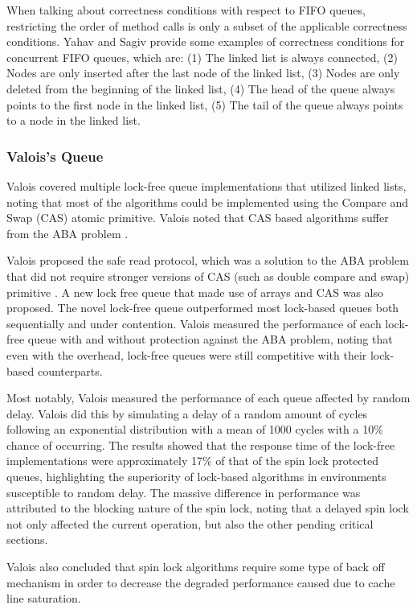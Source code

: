 \documentclass[a4paper, 12pt, titlepage]{article}
\begin{document}
\begin{singlespace}
When talking about correctness conditions with respect to FIFO queues, restricting the order of method calls is only a subset of the applicable correctness conditions. Yahav and Sagiv\cite{yahav2003automatically} provide some examples of correctness conditions for concurrent FIFO queues, which are: (1) The linked list is always connected, (2) Nodes are only inserted after the last node of the linked list, (3) Nodes are only deleted from the beginning of the linked list, (4) The head of the queue always points to the first node in the linked list, (5) The tail of the queue always points to a node in the linked list.

\subsubsection{Valois's Queue}
Valois covered multiple lock-free queue implementations that utilized linked lists, noting that most of the algorithms could be implemented using the Compare and Swap (CAS) atomic primitive. Valois noted that CAS based algorithms suffer from the ABA problem \cite{valois1994implementing}. 

Valois proposed the safe read protocol, which was a solution to the ABA problem that did not require stronger versions of CAS (such as double compare and swap) primitive \cite{valois1994implementing, valois1995lock}. A new lock free queue that made use of arrays and CAS was also proposed. The novel lock-free queue outperformed most lock-based queues both sequentially and under contention. Valois measured the performance of each lock-free queue with and without protection against the ABA problem, noting that even with the overhead, lock-free queues were still competitive with their lock-based counterparts.

Most notably, Valois measured the performance of each queue affected by random delay. Valois did this by simulating a delay of a random amount of cycles following an exponential distribution with a mean of 1000 cycles with a 10\% chance of occurring. The results showed that the response time of the lock-free implementations were approximately 17\% of that of the spin lock protected queues, highlighting the superiority of lock-based algorithms in environments susceptible to random delay. The massive difference in performance was attributed to the blocking nature of the spin lock, noting that a delayed spin lock not only affected the current operation, but also the other pending critical sections.

Valois also concluded that spin lock algorithms require some type of back off mechanism in order to decrease the degraded performance caused due to cache line saturation.


\end{singlespace}
\end{document}
